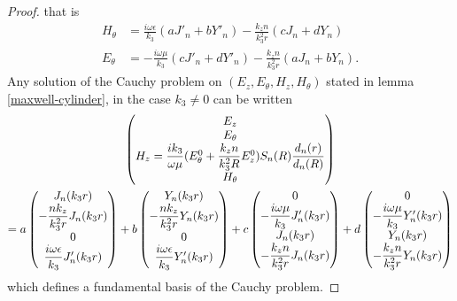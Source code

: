 \begin{proof}
            that is
            \begin{equation}
                \label{HthetaEtheta}
                \begin{aligned}
                H_{\theta}&=\frac{i\omega \epsilon}{k_3}(aJ'_n+bY'_n)-\frac{k_zn}{k_3^2r}( cJ_n+dY_n)
                \\
                 E_{\theta}&=-\frac{i\omega \mu}{k_3} (cJ'_n+dY'_n)-\frac{k_zn}{k_3^2r}( aJ_n+bY_n).
                \end{aligned}
            \end{equation}
            Any solution of the Cauchy problem on $ (E_z,E_{\theta},H_z,H_{\theta})$ stated in lemma \ref{maxwell-cylinder}, in the case $k_3\not=0$ can be written
            \begin{multline*}
                \begin{pmatrix}
                    E_z
                    \cr
                    E_{\theta}
                    \cr
                    H_z=\frac{ik_3}{\omega \mu}(E_{\theta}^0+\frac{k_zn}{k_3^2R}E_z^0)S_n(R)\frac{d_n(r)}{d_n(R)}
                    \cr
                    H_{\theta}
                \end{pmatrix}
                \\
                =
                a\begin{pmatrix}
                    J_n(k_3r)
                    \cr
                    -\frac{nk_z}{k_3^2r}J_n(k_3r)
                    \cr
                    0
                    \cr
                    \frac{i\omega \epsilon}{k_3}J'_n(k_3r)
                \end{pmatrix}
                +b\begin{pmatrix}
                    Y_n(k_3r)
                    \cr
                    -\frac{nk_z}{k_3^2r}Y_n(k_3r)
                    \cr
                    0
                    \cr
                    \frac{i\omega \epsilon}{k_3}Y'_n(k_3r)
                \end{pmatrix}
                +c\begin{pmatrix}
                    0
                    \cr
                    -\frac{i\omega \mu}{k_3}J'_n(k_3r)
                    \cr
                    J_n(k_3r)
                    \cr
                    -\frac{k_zn}{k_3^2r}J_n(k_3r)
                \end{pmatrix}
                +d
                \begin{pmatrix}
                    0
                    \cr
                    -\frac{i\omega \mu}{k_3}Y'_n(k_3r)
                    \cr
                    Y_n(k_3r)
                    \cr
                    -\frac{k_zn}{k_3^2r}Y_n(k_3r)
                \end{pmatrix}
            \end{multline*}
            which defines a fundamental basis of the Cauchy problem.


\end{proof}
